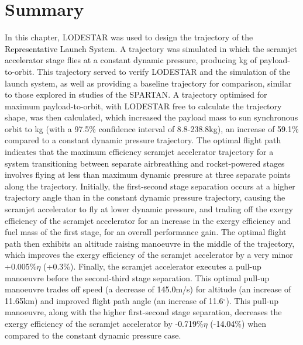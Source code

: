  








\section{Summary}


In this chapter, LODESTAR was used to design the trajectory of the \textcolor{black}{Representative} Launch System. 
A trajectory was simulated in which the scramjet accelerator stage flies at a constant dynamic pressure, producing \PayloadToOrbitConstqNoReturn kg of payload-to-orbit. This trajectory served to verify LODESTAR and the simulation of  the launch system, as well as providing a baseline trajectory for comparison, similar to those explored in studies of the SPARTAN\cite{Preller2017b}. 
A trajectory optimised for maximum payload-to-orbit, with LODESTAR free to calculate the trajectory shape, was then calculated, which increased the payload mass to sun synchronous orbit to \PayloadToOrbitStandardNoReturn kg (with a 97.5\% confidence interval of 8.8-238.8kg), an increase of \textcolor{black}{59.1}\% compared to a constant dynamic pressure trajectory.
  The optimal flight path indicates that the maximum efficiency scramjet accelerator trajectory for a system transitioning between separate airbreathing and rocket-powered stages involves flying at less than maximum dynamic pressure at three separate points along the trajectory. 
  Initially, the first-second stage separation occurs at a higher trajectory angle than in the constant dynamic pressure trajectory, causing the scramjet accelerator to fly at lower dynamic pressure, and trading off the exergy efficiency of the scramjet accelerator for an increase in the exergy efficiency and fuel mass of the first stage, for an overall performance gain. 
  The optimal flight path then exhibits an altitude raising manoeuvre in the middle of the trajectory, which improves the exergy efficiency of the scramjet accelerator by a very minor +0.005\%$\eta$ (+0.3\%). 
  Finally, the scramjet accelerator executes a pull-up manoeuvre before the second-third stage separation. This optimal pull-up manoeuvre trades off speed (a decrease of \textcolor{black}{145.0}m/s) for altitude (an increase of \textcolor{black}{11.65}km) and improved flight path angle (an increase of \textcolor{black}{11.6}$^\circ$). This pull-up manoeuvre, along with the higher first-second stage separation, decreases the exergy efficiency of the scramjet accelerator by -\textcolor{black}{0.719}\%$\eta$ (-\textcolor{black}{14.04}\%) when compared to the constant dynamic pressure case. 

